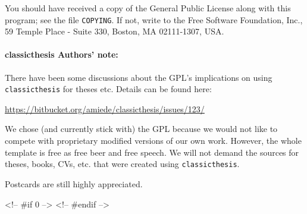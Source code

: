 You should have received a copy of the  General
Public License
along with this program; see the file \texttt{COPYING}.  If not,
write to
the Free Software Foundation, Inc., 59 Temple Place - Suite 330,
Boston, MA 02111-1307, USA.

\paragraph{classicthesis Authors' note:} There have been some discussions about the GPL's implications on using \texttt{classicthesis} for theses etc. Details can be found here:
\begin{center}
  \url{https://bitbucket.org/amiede/classicthesis/issues/123/}
\end{center}

We chose (and currently stick with) the GPL because we would not like to compete with proprietary modified versions of our own work. However, the whole template is free as free beer and free speech. We will not demand the sources for theses, books, CVs, etc. that were created using \texttt{classicthesis}.

Postcards are still highly appreciated.




<!-- #if 0 -->
<!-- #endif -->

